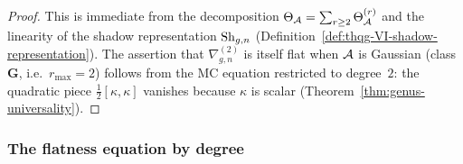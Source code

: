 \begin{proof}
This is immediate from the decomposition
$\Theta_{\mathcal{A}} = \sum_{r \geq 2} \Theta_{\mathcal{A}}^{(r)}$
and the linearity of the shadow representation
$\operatorname{Sh}_{g,n}$ (Definition~\ref{def:thqg-VI-shadow-representation}).
The assertion that $\nabla^{(2)}_{g,n}$ is itself flat when
$\mathcal{A}$ is Gaussian (class~$\mathbf{G}$, i.e.~$r_{\max} = 2$) follows
from the MC equation restricted to degree~$2$: the quadratic piece
$\tfrac{1}{2}[\kappa,\kappa]$ vanishes because $\kappa$ is scalar
(Theorem~\ref{thm:genus-universality}).
\end{proof}

\subsubsection{The flatness equation by degree}

